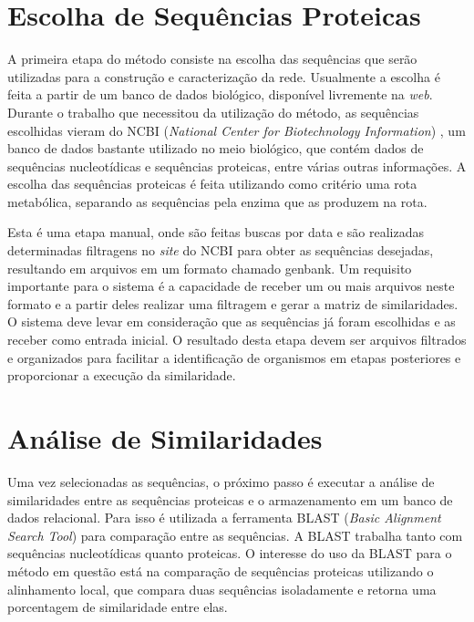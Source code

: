 \section{Escolha de Sequências Proteicas} \label{sec:escseq}

A primeira etapa do método consiste na escolha das sequências que serão utilizadas para a construção e caracterização da rede.
Usualmente a escolha é feita a partir de um banco de dados biológico, disponível livremente na \textit{web}. Durante o trabalho que necessitou da utilização
do método, as sequências escolhidas vieram do NCBI (\textit{National Center for Biotechnology Information}) \cite{ncbi},
um banco de dados bastante utilizado no
meio biológico, que contém dados de sequências
nucleotídicas e sequências proteicas, entre várias outras informações. A escolha das sequências proteicas é feita utilizando como critério
uma rota metabólica, separando as sequências pela enzima que as produzem na rota.



Esta é uma etapa manual, onde são feitas buscas por data e são realizadas determinadas filtragens no \textit{site} do NCBI para obter as sequências desejadas, 
resultando em arquivos em um formato chamado \gls{genbank}. Um requisito importante para o sistema é a capacidade de receber um ou mais arquivos neste
formato e a partir deles
realizar uma filtragem e gerar a matriz de similaridades. O sistema deve levar em consideração que as sequências já foram escolhidas
e as receber como entrada inicial. O resultado desta etapa devem ser arquivos filtrados e organizados para facilitar a identificação de organismos em etapas
posteriores e proporcionar a execução da similaridade.

\section{Análise de Similaridades} \label{sec:similaridade}

Uma vez selecionadas as sequências, o próximo passo é executar a análise de similaridades entre as sequências proteicas e o armazenamento em um banco
de dados relacional. Para isso é utilizada a ferramenta BLAST (\textit{Basic Alignment Search Tool}) \cite{blast1997} para comparação entre as sequências.
A BLAST
trabalha tanto com sequências nucleotídicas quanto proteicas. O interesse do uso da BLAST para o método em questão está na comparação de sequências proteicas
utilizando o alinhamento local, que compara duas sequências isoladamente e retorna uma porcentagem de similaridade entre elas.


